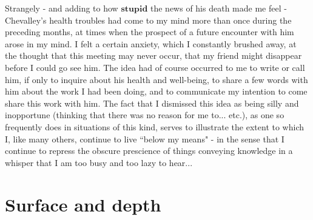 Strangely - and adding to how $\textbf{stupid}$ the news of his death made me feel - Chevalley's health troubles had come to my mind more than once during the preceding months, at times when the prospect of a future encounter with him arose in my mind. I felt a certain anxiety, which I constantly brushed away, at the thought that this meeting may never occur, that my friend might disappear before I could go see him. The idea had of course occurred to me to write or call him, if only to inquire about his health and well-being, to share a few words with him about the work I had been doing, and to communicate my intention to come share this work with him. The fact that I dismissed this idea as being silly and inopportune (thinking that there was no reason for me to... etc.), as one so frequently does in situations of this kind, serves to illustrate the extent to which I, like many others, continue to live ``below my means" - in the sense that I continue to repress the obscure prescience of things conveying knowledge in a whisper that I am too busy and too lazy to hear...
 
 \section{Surface and depth}
 
 
 
 













%
